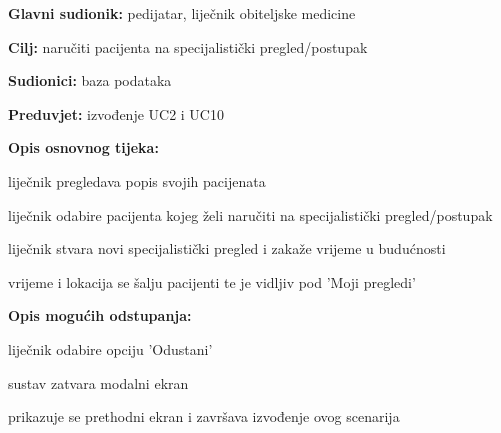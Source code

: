      
                    \noindent {}
					\begin{packed_item}
	
						\item \textbf{Glavni sudionik: }pedijatar, liječnik obiteljske medicine
						\item  \textbf{Cilj:} naručiti pacijenta na specijalistički pregled/postupak
						\item  \textbf{Sudionici:} baza podataka
						\item  \textbf{Preduvjet:} izvođenje UC2 i UC10
						\item  \textbf{Opis osnovnog tijeka:}
						
						\item[] \begin{packed_enum}
							
							\item liječnik pregledava popis svojih pacijenata
							\item liječnik odabire pacijenta kojeg želi naručiti na specijalistički pregled/postupak
							\item liječnik stvara novi specijalistički pregled i zakaže vrijeme u budućnosti
                            \item vrijeme i lokacija se šalju pacijenti te je vidljiv pod 'Moji pregledi'

						\end{packed_enum}
						\item  \textbf{Opis mogućih odstupanja:}
						
						\item[] \begin{packed_item}
	
							\item[5.a] liječnik odabire opciju 'Odustani'
							\item [] \begin{packed_enum}
								\item sustav zatvara modalni ekran
								\item prikazuje se prethodni ekran i završava izvođenje ovog scenarija
							\end{packed_enum}
						\end{packed_item}
					\end{packed_item}


